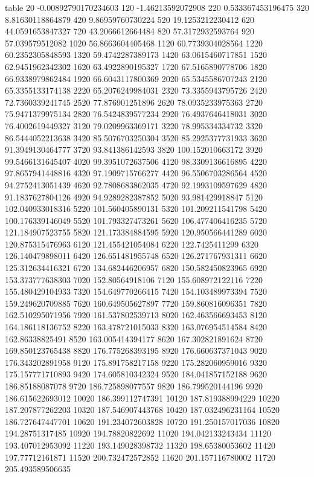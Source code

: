 table {%
20 -0.00892790170234603
120 -1.46213592072908
220 0.533367453196475
320 8.81630118864879
420 9.86959760730224
520 19.1253212230412
620 44.0591653847327
720 43.2066612664484
820 57.3172932593764
920 57.039579512082
1020 56.8663604405468
1120 60.7739304028564
1220 60.2352305848593
1320 59.4742287389173
1420 63.0615460717851
1520 62.9451962342302
1620 63.4922890195327
1720 67.5165890778706
1820 66.9338979862484
1920 66.6043117800369
2020 65.5345586707243
2120 65.3355133174138
2220 65.2076249984031
2320 73.3355943795726
2420 72.7360339241745
2520 77.876901251896
2620 78.0935233975363
2720 75.9471379975134
2820 76.5424839577234
2920 76.4937646418031
3020 76.4002619449327
3120 79.0209963369171
3220 78.995334334732
3320 86.5444052213638
3420 85.5076703250304
3520 85.2925377731933
3620 91.3949130464777
3720 93.841386142593
3820 100.152010663172
3920 99.5466131645407
4020 99.3951072637506
4120 98.3309136616895
4220 97.8657941448816
4320 97.1909715766277
4420 96.5506703286564
4520 94.2752413051439
4620 92.7808683862035
4720 92.1993109597629
4820 91.1837627804126
4920 94.9289282387852
5020 93.981429918847
5120 102.040933018316
5220 101.560405890131
5320 101.209211541798
5420 100.176339146049
5520 101.793327473261
5620 106.477406416235
5720 121.184907523755
5820 121.173384884595
5920 120.950566441289
6020 120.875315476963
6120 121.455421054084
6220 122.7425411299
6320 126.140479898011
6420 126.651481955748
6520 126.271767931311
6620 125.312634416321
6720 134.682446206957
6820 150.582450823965
6920 153.373777638303
7020 152.80564918106
7120 155.608972122116
7220 155.480429104933
7320 154.649770266415
7420 154.103489973394
7520 159.249620709885
7620 160.649505627897
7720 159.860816096351
7820 162.510295071956
7920 161.537802539713
8020 162.463566693453
8120 164.186118136752
8220 163.478721015033
8320 163.076954514584
8420 162.86338825491
8520 163.005414394177
8620 167.302821891624
8720 169.850123765438
8820 176.775268393195
8920 176.660637371043
9020 176.343202891958
9120 175.891758217158
9220 175.282060959016
9320 175.157771710893
9420 174.605810342324
9520 184.041857152188
9620 186.85188087078
9720 186.725898077557
9820 186.799520144196
9920 186.615622693012
10020 186.399112747391
10120 187.819388994229
10220 187.207877262203
10320 187.546907443768
10420 187.032496231164
10520 186.727647447701
10620 191.234072603828
10720 191.250157017036
10820 194.28751317485
10920 194.78820822692
11020 194.042133243434
11120 193.407012953092
11220 193.149028398732
11320 198.65380053602
11420 197.77712161871
11520 200.732472572852
11620 201.157116780002
11720 205.493589506635
}
